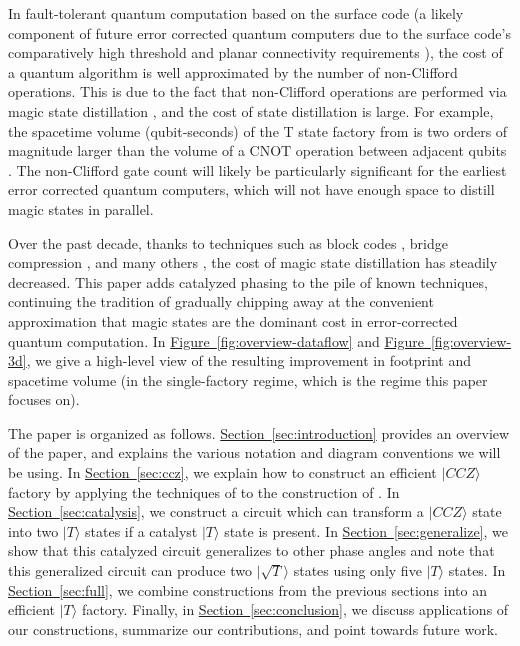 \documentclass[superscriptaddress,notitlepage,longbibliography]{revtex4-1}
\renewcommand{\sec}[1]{\hyperref[sec:#1]{Section~\ref*{sec:#1}}}
\newcommand{\fig}[1]{\hyperref[fig:#1]{Figure~\ref*{fig:#1}}}
\begin{document}
In fault-tolerant quantum computation based on the surface code (a likely component of future error corrected quantum computers due to the surface code's comparatively high threshold and planar connectivity requirements \cite{Brav98,Denn02,Raus07,Raus07d,Fowl12f}), the cost of a quantum algorithm is well approximated by the number of non-Clifford operations.
This is due to the fact that non-Clifford operations are performed via magic state distillation \cite{bravyi2005}, and the cost of state distillation is large.
For example, the spacetime volume (qubit-seconds) of the T state factory from \cite{fowler2018} is two orders of magnitude larger than the volume of a CNOT operation between adjacent qubits \cite{horsman2012}.
The non-Clifford gate count will likely be particularly significant for the earliest error corrected quantum computers, which will not have enough space to distill magic states in parallel.

Over the past decade, thanks to techniques such as block codes \cite{bravyi2012, fowler2013}, bridge compression \cite{fowler2012}, and many others \cite{horsman2012, campbell2017, campbell2018, litinski2018}, the cost of magic state distillation has steadily decreased.
This paper adds catalyzed phasing to the pile of known techniques, continuing the tradition of gradually chipping away at the convenient approximation that magic states are the dominant cost in error-corrected quantum computation.
In \fig{overview-dataflow} and \fig{overview-3d}, we give a high-level view of the resulting improvement in footprint and spacetime volume (in the single-factory regime, which is the regime this paper focuses on).

The paper is organized as follows.
\sec{introduction} provides an overview of the paper, and explains the various notation and diagram conventions we will be using.
In \sec{ccz}, we explain how to construct an efficient $|CCZ\rangle$ factory by applying the techniques of \cite{fowler2018} to the construction of \cite{jones2013, eastin2013distilling}.
In \sec{catalysis}, we construct a circuit which can transform a $|CCZ\rangle$ state into two $|T\rangle$ states if a catalyst $|T\rangle$ state is present.
In \sec{generalize}, we show that this catalyzed circuit generalizes to other phase angles and note that this generalized circuit can produce two $|\sqrt{T}\rangle$ states using only five $|T\rangle$ states.
In \sec{full}, we combine constructions from the previous sections into an efficient $|T\rangle$ factory.
Finally, in \sec{conclusion}, we discuss applications of our constructions, summarize our contributions, and point towards future work.
\end{document}
